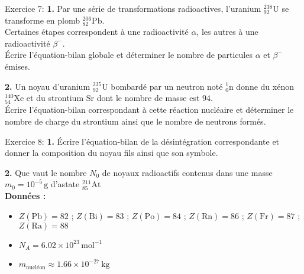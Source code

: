 \documentclass[12pt, french]{article}
\begin{document}
\begin{Box2}{Exercice 7: }
\textbf{1.} Par une série de transformations radioactives, l’uranium \(^ {238}_{92} \mathrm{U}\) se transforme en plomb \(^ {206}_{82} \mathrm{Pb}\). \\
Certaines étapes correspondent à une radioactivité \(\alpha\), les autres à une radioactivité \(\beta^-\). \\
Écrire l’équation-bilan globale et déterminer le nombre de particules \(\alpha\) et \(\beta^-\) émises.


\textbf{2.} Un noyau d’uranium \(^ {235}_{92} \mathrm{U}\) bombardé par un neutron noté \(^ {1}_{0} \mathrm{n}\) donne du xénon \(^ {140}_{54} \mathrm{Xe}\) et du strontium \(\mathrm{Sr}\) dont le nombre de masse est \(94\). \\
Écrire l’équation-bilan correspondant à cette réaction nucléaire et déterminer le nombre de charge du strontium ainsi que le nombre de neutrons formés.

  
\end{Box2}
\begin{Box2}{Exercice 8:}
 \textbf{1.} Écrire l’équation-bilan de la désintégration correspondante et donner la composition du noyau fils ainsi que son symbole.

\vspace{0.5cm}

\textbf{2.} Que vaut le nombre \(N_0\) de noyaux radioactifs contenus dans une masse \(m_0 = 10^{-5} \, \mathrm{g}\) d’astate \(^ {211}_{85} \mathrm{At}\)\\

\textbf{Données :}
\begin{itemize}
    \item \(Z(\mathrm{Pb}) = 82\) ; \(Z(\mathrm{Bi}) = 83\) ; \(Z(\mathrm{Po}) = 84\) ; \(Z(\mathrm{Rn}) = 86\) ; \(Z(\mathrm{Fr}) = 87\) ; \(Z(\mathrm{Ra}) = 88\)
    \item \(N_A = 6.02 \times 10^{23} \, \mathrm{mol}^{-1}\)
    \item \(m_\text{nucléon} \approx 1.66 \times 10^{-27} \, \mathrm{kg}\)
\end{itemize}
\end{Box2}
\end{document}
